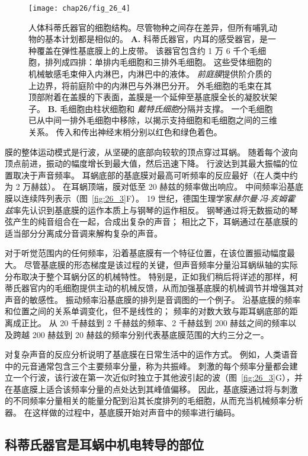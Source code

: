 \begin{figure}[htbp]
	\centering
	\texttt{[image: chap26/fig\_26\_4]}
	\caption{人体科蒂氏器官的细胞结构。尽管物种之间存在差异，但所有哺乳动物的基本计划都是相似的。
		\textbf{A.} 科蒂氏器官，内耳的感受器官，是一种覆盖在弹性基底膜上的上皮带。
		该器官包含约 1 万 6 千个毛细胞，排列成四排：单排内毛细胞和三排外毛细胞。
		这些受体细胞的机械敏感毛束伸入内淋巴，内淋巴中的液体。
		\textit{前庭膜}提供阶介质的上边界，将前庭阶中的内淋巴与外淋巴分开。
		外毛细胞的毛束在其顶部附着在盖膜的下表面，盖膜是一个延伸至基底膜全长的凝胶状架子。
		\textbf{B.} 毛细胞由柱状细胞和 \textit{戴特氏细胞}分隔并支撑。
		一个毛细胞已从中间一排外毛细胞中移除，以揭示支持细胞和毛细胞之间的三维关系。
		传入和传出神经末梢分别以红色和绿色着色。}
	\label{fig:26_4}
\end{figure}


膜的整体运动模式是行波，从坚硬的底部向较软的顶点穿过耳蜗。
随着每个波向顶点前进，振动的幅度增长到最大值，然后迅速下降。
行波达到其最大振幅的位置取决于声音频率。
耳蜗底部的基底膜对最高可听频率的反应最好（在人类中约为 2 万赫兹）。
在耳蜗顶端，膜对低至 20 赫兹的频率做出响应。
中间频率沿基底膜以连续阵列表示（图~\ref{fig:26_3}F）。
19 世纪，德国生理学家\textit{赫尔曼$\cdot$冯$\cdot$亥姆霍兹}率先认识到基底膜的运作本质上与钢琴的运作相反。
钢琴通过将无数振动的琴弦产生的纯音组合在一起，合成出复杂的声音；
相比之下，耳蜗通过在基底膜的适当部分分离成分音调来解构复杂的声音。


对于听觉范围内的任何频率，沿着基底膜有一个特征位置，在该位置振动幅度最大。
尽管基底膜的形态梯度是该过程的关键，但声音频率分量沿耳蜗纵轴的实际分布取决于整个耳蜗分区的机械特性。
特别是，正如我们稍后将详述的那样，柯蒂氏器官内的毛细胞提供主动的机械反馈，从而加强基底膜的机械调节并增强其对声音的敏感性。
振动频率沿基底膜的排列是音调图的一个例子。
沿基底膜的频率和位置之间的关系单调变化，但不是线性的； 频率的对数大致与距耳蜗底部的距离成正比。
从 20 千赫兹到 2 千赫兹的频率、2 千赫兹到 200 赫兹之间的频率以及跨越 200 赫兹到 20 赫兹的频率分别代表基底膜范围的大约三分之一。


对复杂声音的反应分析说明了基底膜在日常生活中的运作方式。
例如，人类语音中的元音通常包含三个主要频率分量，称为共振峰。
刺激的每个频率分量都会建立一个行波，该行波在第一次近似时独立于其他波引起的波（图~\ref{fig:26_3}G），并在基底膜上适合该频率分量的点处达到其峰值偏移。
因此，基底膜通过将与刺激的不同频率分量相关的能量分配到沿其长度排列的毛细胞，从而充当机械频率分析器。
在这样做的过程中，基底膜开始对声音中的频率进行编码。



\subsection{科蒂氏器官是耳蜗中机电转导的部位}

